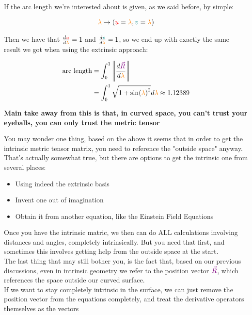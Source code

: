 If the arc length we're interested about is given, as we said before, by simple:

\begin{equation}
    \begingroup\color{orange}\lambda\endgroup \rightarrow (\begingroup\color{red}u\endgroup = \begingroup\color{orange}\lambda\endgroup, \begingroup\color{teal}v\endgroup = \begingroup\color{orange}\lambda\endgroup)
\end{equation}

Then we have that $\frac{d \begingroup\color{red}u\endgroup}{d \begingroup\color{orange}\lambda\endgroup} = 1$ and $\frac{d \begingroup\color{teal}v\endgroup}{d \begingroup\color{orange}\lambda\endgroup} = 1$, so
we end up with exactly the same result we got when using the extrinsic approach:

\begin{align*}
    \text{arc length} &= \int_{0}^{1} \norm{\frac{d\begingroup\color{violet}\vec{R}\endgroup}{d\begingroup\color{orange}\lambda\endgroup}}\\
    &= \int_{0}^{1} \sqrt{1 + \sin(\begingroup\color{orange}\lambda\endgroup)^2} d\begingroup\color{orange}\lambda\endgroup \approx 1.12389
\end{align*}

\textbf{Main take away from this is that, in curved space, you can't trust your eyeballs, you can only trust the metric tensor}

You may wonder one thing, based on the above it seems that in order to get the intrinsic metric tensor matrix, you need to reference
the "outside space" anyway. That's actually somewhat true, but there are options to get the intrinsic one from several places:
\begin{itemize}
    \item Using indeed the extrinsic basis
    \item Invent one out of imagination
    \item Obtain it from another equation, like the Einstein Field Equations
\end{itemize}

Once you have the intrinsic matric, we then can do ALL calculations involving distances and angles, completely intrinsically.
But you need that first, and sometimes this involves getting help from the outside space at the start.\\

The last thing that may still bother you, is the fact that, based on our previous discussions, even in intrinsic geometry we 
refer to the position vector $\color{violet}\vec{R}$, which references the space outside our curved surface.\\
If we want to stay completely intrinsic in the surface, we can just remove the position vector from the equations completely, and 
treat the derivative operators themselves as the vectors